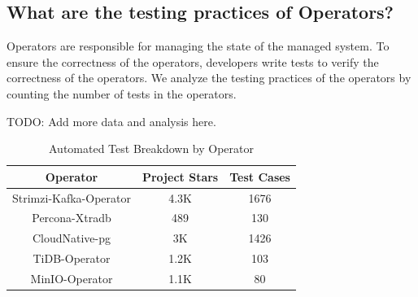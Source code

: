 \subsection{What are the testing practices of Operators?}
Operators are responsible for managing the state of the managed system. To
ensure the correctness of the operators, developers write tests to verify the
correctness of the operators. We analyze the testing practices of the operators
by counting the number of tests in the operators.

TODO: Add more data and analysis here.

\begin{table}[h]
    \centering
    \begin{tabular}{|c|c|c|}
        \hline
        \textbf{Operator}      & \textbf{Project Stars} & \textbf{Test Cases} \\
        \hline
        Strimzi-Kafka-Operator & 4.3K                   & 1676                \\
        Percona-Xtradb         & 489                    & 130                 \\
        CloudNative-pg         & 3K                     & 1426                \\
        TiDB-Operator          & 1.2K                   & 103                 \\
        MinIO-Operator         & 1.1K                   & 80                  \\
        \hline
    \end{tabular}
    \caption{Automated Test Breakdown by Operator}
    \label{tab:testing}
\end{table}
